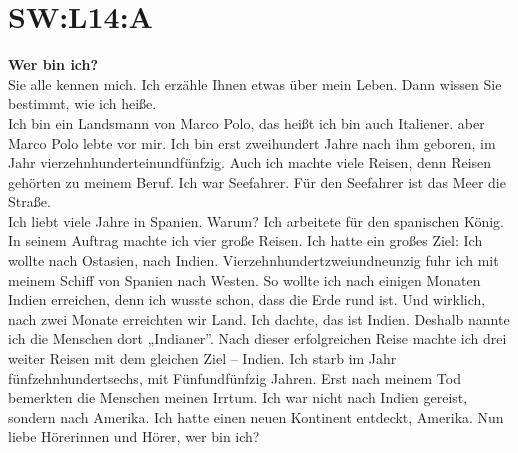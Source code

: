 \section{SW:L14:A}
\textbf{Wer bin ich?} \\
Sie alle kennen mich. Ich erzähle Ihnen etwas über mein Leben.
Dann wissen Sie bestimmt, wie ich heiße. \\
Ich bin ein Landsmann von Marco Polo, das heißt ich bin auch Italiener.
aber Marco Polo lebte vor mir. Ich bin erst zweihundert Jahre nach ihm geboren,
im Jahr vierzehnhunderteinundfünfzig. Auch ich machte viele Reisen,
denn Reisen gehörten zu meinem Beruf.  Ich war Seefahrer.
Für den Seefahrer ist das Meer die Straße. \\
Ich liebt viele Jahre in Spanien. Warum? Ich arbeitete für den spanischen König.
In seinem Auftrag  machte ich vier große Reisen.
Ich hatte ein großes Ziel:  Ich wollte nach Ostasien, nach Indien.
Vierzehnhundertzweiundneunzig fuhr ich mit meinem Schiff von Spanien nach Westen.
So wollte ich nach einigen Monaten Indien erreichen,
denn ich wusste schon, dass die Erde rund ist.
Und wirklich, nach zwei Monate erreichten wir Land. Ich dachte, das ist Indien.
Deshalb nannte ich die Menschen dort „Indianer”.
Nach dieser erfolgreichen  Reise machte ich drei weiter Reisen mit dem gleichen Ziel -- Indien.
Ich starb im Jahr fünfzehnhundertsechs, mit Fünfundfünfzig Jahren. 
Erst nach meinem Tod  bemerkten die Menschen meinen Irrtum. 
Ich war nicht nach Indien gereist, sondern nach Amerika.
Ich hatte einen neuen Kontinent entdeckt, Amerika. 
Nun liebe Hörerinnen und Hörer, wer bin ich? \\

